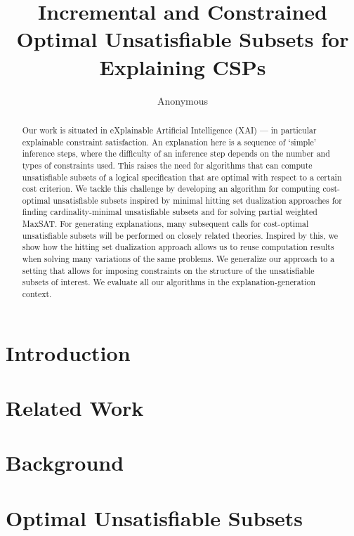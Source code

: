 \documentclass[letterpaper]{article} %
\title{Incremental and Constrained Optimal Unsatisfiable Subsets for Explaining CSPs}
\author{Anonymous}
\newcommand\comment[1]{\marginpar{\parbox{\marginparwidth}{\tiny #1}}}
\newcommand{\todo}[1]{{\comment{\color{red}\textsc{TODO:}#1} }}
\renewcommand{\todo}[1]{{\comment{\color{red}\textsc{TODO:}#1} }}
\newcommand\maxsat{MaxSAT\xspace}
\begin{document}
\maketitle

\begin{abstract}
Our work is situated in eXplainable Artificial Intelligence (XAI) --- in particular explainable constraint satisfaction.
An explanation here is a sequence of `simple' inference steps, where the difficulty of an inference step depends on the number and types of constraints used.
This raises the need for algorithms that can compute unsatisfiable subsets of a logical specification that are optimal with respect to a certain cost criterion.
We tackle this challenge by developing an algorithm for computing cost-optimal unsatisfiable subsets inspired by minimal hitting set dualization approaches for finding cardinality-minimal unsatisfiable subsets and for solving partial weighted \maxsat.
For generating explanations, many subsequent calls for cost-optimal unsatisfiable subsets will be performed on closely related theories.
Inspired by this, we show how the hitting set dualization approach allows us to reuse computation results when solving many variations of the same problems.
We generalize our approach to a setting that allows for imposing constraints on the structure of the unsatisfiable subsets of interest. 
We evaluate all our algorithms in the explanation-generation context.
\end{abstract}

\section{Introduction}

\section{Related Work}\label{sec:related}

\section{Background}\label{sec:backgr}\label{sec:background}


\section{Optimal Unsatisfiable Subsets}\label{sec:omus}

\end{document}

